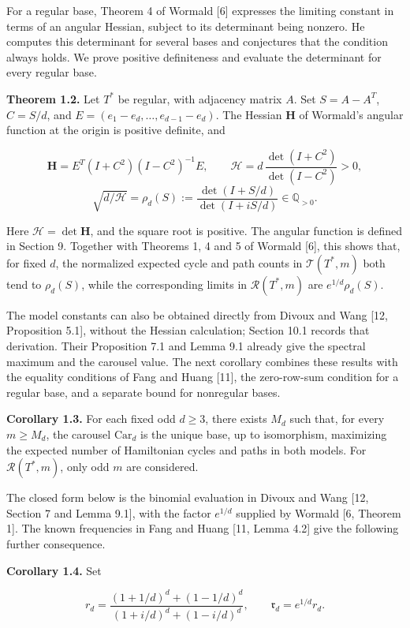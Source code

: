 \documentclass[11pt,a4paper]{article}
\begin{document}
For a regular base, Theorem 4 of Wormald {[}6{]} expresses the limiting constant in terms of an angular Hessian, subject to its determinant being nonzero. He computes this determinant for several bases and conjectures that the condition always holds. We prove positive definiteness and evaluate the determinant for every regular base.

\textbf{Theorem 1.2.} Let \(T^*\) be regular, with adjacency matrix \(A\). Set \(S=A-A^T\), \(C=S/d\), and \(E=(e_1-e_d,\ldots,e_{d-1}-e_d)\). The Hessian \(\mathbf H\) of Wormald's angular function at the origin is positive definite, and

\[
\mathbf H=E^T(I+C^2)(I-C^2)^{-1}E,\qquad
\mathcal H=d\,\frac{\det(I+C^2)}{\det(I-C^2)}>0,
\] \[
\sqrt{d/\mathcal H}=\rho_d(S)
:=\frac{\det(I+S/d)}{\det(I+iS/d)}\in\mathbb Q_{>0}.
\]

Here \(\mathcal H=\det\mathbf H\), and the square root is positive. The angular function is defined in Section 9. Together with Theorems 1, 4 and 5 of Wormald {[}6{]}, this shows that, for fixed \(d\), the normalized expected cycle and path counts in \(\mathcal T(T^*,m)\) both tend to \(\rho_d(S)\), while the corresponding limits in \(\mathcal R(T^*,m)\) are \(e^{1/d}\rho_d(S)\).

The model constants can also be obtained directly from Divoux and Wang {[}12, Proposition 5.1{]}, without the Hessian calculation; Section 10.1 records that derivation. Their Proposition 7.1 and Lemma 9.1 already give the spectral maximum and the carousel value. The next corollary combines these results with the equality conditions of Fang and Huang {[}11{]}, the zero-row-sum condition for a regular base, and a separate bound for nonregular bases.

\textbf{Corollary 1.3.} For each fixed odd \(d\ge3\), there exists \(M_d\) such that, for every \(m\ge M_d\), the carousel \(\mathrm{Car}_d\) is the unique base, up to isomorphism, maximizing the expected number of Hamiltonian cycles and paths in both models. For \(\mathcal R(T^*,m)\), only odd \(m\) are considered.

The closed form below is the binomial evaluation in Divoux and Wang {[}12, Section 7 and Lemma 9.1{]}, with the factor \(e^{1/d}\) supplied by Wormald {[}6, Theorem 1{]}. The known frequencies in Fang and Huang {[}11, Lemma 4.2{]} give the following further consequence.

\textbf{Corollary 1.4.} Set

\[
r_d=\frac{(1+1/d)^d+(1-1/d)^d}{(1+i/d)^d+(1-i/d)^d},
\qquad \mathfrak r_d=e^{1/d}r_d.
\]
\end{document}
